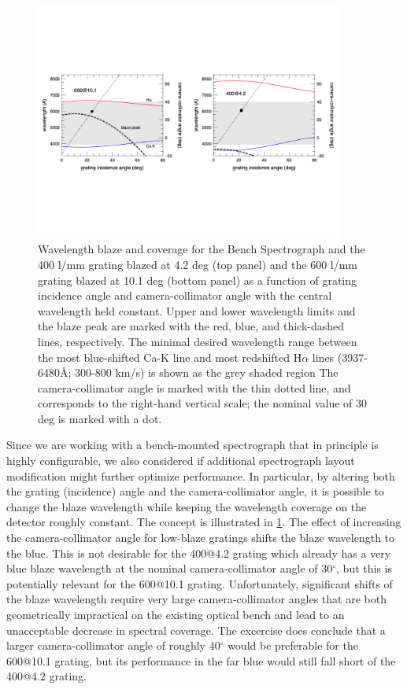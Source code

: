 \begin{appendices}
\begin{figure}[htb]
  \centering
\vskip -1.25in
  \includegraphics[width=0.9\textwidth]{891_1/figs/blaze_plot_land.pdf}
\vskip -1.25in
  \caption{\label{fig:spec_config} Wavelength blaze and coverage for
    the Bench Spectrograph and the 400 l/mm grating blazed at 4.2 deg
    (top panel) and the 600 l/mm grating blazed at 10.1 deg (bottom
    panel) as a function of grating incidence angle and
    camera-collimator angle with the central wavelength held
    constant. Upper and lower wavelength limits and the blaze peak are
    marked with the red, blue, and thick-dashed lines,
    respectively. The minimal desired wavelength range between the
    most blue-shifted Ca-K line and most redshifted H$\alpha$ lines
    (3937-6480\AA; 300-800 km/s) is shown as the grey shaded region
    The camera-collimator angle is marked with the thin dotted line,
    and corresponds to the right-hand vertical scale; the nominal
    value of 30 deg is marked with a dot.}
\end{figure}

Since we are working with a bench-mounted spectrograph that in
principle is highly configurable, we also considered if additional
spectrograph layout modification might further optimize
performance. In particular, by altering both the grating (incidence)
angle and the camera-collimator angle, it is possible to change the
blaze wavelength while keeping the wavelength coverage on the detector
roughly constant. The concept is illustrated in \ref{fig:spec_config}.
The effect of increasing the camera-collimator angle for low-blaze
gratings shifts the blaze wavelength to the blue. This is not
desirable for the 400@4.2 grating which already has a very blue blaze
wavelength at the nominal camera-collimator angle of 30$^{\circ}$, but
this is potentially relevant for the 600@10.1 grating. Unfortunately,
significant shifts of the blaze wavelength require very large
camera-collimator angles that are both geometrically impractical on
the existing optical bench and lead to an unacceptable decrease in
spectral coverage. The excercise does conclude that a larger
camera-collimator angle of roughly 40$^{\circ}$ would be preferable
for the 600@10.1 grating, but its performance in the far blue would
still fall short of the 400@4.2 grating.


\end{appendices}

